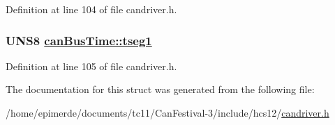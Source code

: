 Definition at line 104 of file candriver.h.\hypertarget{structcanBusTime_3532d6d7cd2b1f3980b82dfce78f0fe9}{
\subsubsection[tseg1]{\setlength{\rightskip}{0pt plus 5cm}UNS8 \hyperlink{structcanBusTime_3532d6d7cd2b1f3980b82dfce78f0fe9}{can\-Bus\-Time::tseg1}}}
\label{structcanBusTime_3532d6d7cd2b1f3980b82dfce78f0fe9}




Definition at line 105 of file candriver.h.

The documentation for this struct was generated from the following file:\begin{CompactItemize}
\item 
/home/epimerde/documents/tc11/Can\-Festival-3/include/hcs12/\hyperlink{candriver_8h}{candriver.h}\end{CompactItemize}

